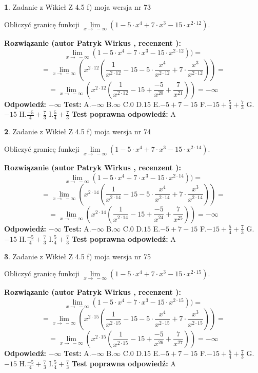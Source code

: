 \documentclass[12pt, a4paper]{article}
\theoremstyle{definition} %
\newtheorem{zad}{}
\newcommand{\zadStart}[1]{\begin{zad}#1\newline}
\newcommand{\zadStop}{\end{zad}}
\newcommand{\rozwStart}[2]{\noindent \textbf{Rozwiązanie (autor #1 , recenzent #2): }\newline}
\newcommand{\rozwStop}{\newline}
\newcommand{\odpStart}{\noindent \textbf{Odpowiedź:}\newline}
\newcommand{\odpStop}{\newline}
\newcommand{\testStart}{\noindent \textbf{Test:}\newline}
\newcommand{\testStop}{\newline}
\newcommand{\kluczStart}{\noindent \textbf{Test poprawna odpowiedź:}\newline}
\newcommand{\kluczStop}{\newline}
\begin{document}
\zadStart{Zadanie z Wikieł Z 4.5 f) moja wersja nr 73}



Obliczyć granicę funkcji  $\lim\limits_{x\to\ -\infty}(1 - 5 \cdot x^{4}+7 \cdot x^{3}- 15 \cdot x^{2\cdot12})$.
\zadStop
\rozwStart{Patryk Wirkus}{}
$$\lim\limits_{x\to\ -\infty}(1 - 5 \cdot x^{4}+7 \cdot x^{3}- 15 \cdot x^{2\cdot12}))=$$
$$=\lim\limits_{x\to\ -\infty}(x^{2\cdot12}(\frac{1}{x^{2\cdot12}}-15 -5 \cdot \frac{x^{4}}{x^{2\cdot12}}+7 \cdot \frac{x^{3}}{x^{2\cdot12}}))=$$
$$=\lim\limits_{x\to\ -\infty}(x^{2\cdot12}(\frac{1}{x^{2\cdot12}}-15 + \frac{-5}{x^{20}}+ \frac{7}{x^{21}}))=-\infty$$
\rozwStop
\odpStart
$-\infty$
\odpStop
\testStart
A.$-\infty$ B.$\infty$ C.$0$ D.$15$ E.$-5 + 7 - 15$
F.$-15+\frac{5}{4}+\frac{7}{3}$ G.$-15$
H.$\frac{-5}{4}+\frac{7}{3}$
I.$\frac{5}{4}+\frac{7}{3}$
\testStop
\kluczStart
A
\kluczStop



\zadStart{Zadanie z Wikieł Z 4.5 f) moja wersja nr 74}



Obliczyć granicę funkcji  $\lim\limits_{x\to\ -\infty}(1 - 5 \cdot x^{4}+7 \cdot x^{3}- 15 \cdot x^{2\cdot14})$.
\zadStop
\rozwStart{Patryk Wirkus}{}
$$\lim\limits_{x\to\ -\infty}(1 - 5 \cdot x^{4}+7 \cdot x^{3}- 15 \cdot x^{2\cdot14}))=$$
$$=\lim\limits_{x\to\ -\infty}(x^{2\cdot14}(\frac{1}{x^{2\cdot14}}-15 -5 \cdot \frac{x^{4}}{x^{2\cdot14}}+7 \cdot \frac{x^{3}}{x^{2\cdot14}}))=$$
$$=\lim\limits_{x\to\ -\infty}(x^{2\cdot14}(\frac{1}{x^{2\cdot14}}-15 + \frac{-5}{x^{24}}+ \frac{7}{x^{25}}))=-\infty$$
\rozwStop
\odpStart
$-\infty$
\odpStop
\testStart
A.$-\infty$ B.$\infty$ C.$0$ D.$15$ E.$-5 + 7 - 15$
F.$-15+\frac{5}{4}+\frac{7}{3}$ G.$-15$
H.$\frac{-5}{4}+\frac{7}{3}$
I.$\frac{5}{4}+\frac{7}{3}$
\testStop
\kluczStart
A
\kluczStop



\zadStart{Zadanie z Wikieł Z 4.5 f) moja wersja nr 75}



Obliczyć granicę funkcji  $\lim\limits_{x\to\ -\infty}(1 - 5 \cdot x^{4}+7 \cdot x^{3}- 15 \cdot x^{2\cdot15})$.
\zadStop
\rozwStart{Patryk Wirkus}{}
$$\lim\limits_{x\to\ -\infty}(1 - 5 \cdot x^{4}+7 \cdot x^{3}- 15 \cdot x^{2\cdot15}))=$$
$$=\lim\limits_{x\to\ -\infty}(x^{2\cdot15}(\frac{1}{x^{2\cdot15}}-15 -5 \cdot \frac{x^{4}}{x^{2\cdot15}}+7 \cdot \frac{x^{3}}{x^{2\cdot15}}))=$$
$$=\lim\limits_{x\to\ -\infty}(x^{2\cdot15}(\frac{1}{x^{2\cdot15}}-15 + \frac{-5}{x^{26}}+ \frac{7}{x^{27}}))=-\infty$$
\rozwStop
\odpStart
$-\infty$
\odpStop
\testStart
A.$-\infty$ B.$\infty$ C.$0$ D.$15$ E.$-5 + 7 - 15$
F.$-15+\frac{5}{4}+\frac{7}{3}$ G.$-15$
H.$\frac{-5}{4}+\frac{7}{3}$
I.$\frac{5}{4}+\frac{7}{3}$
\testStop
\kluczStart
A
\kluczStop
\end{document}
